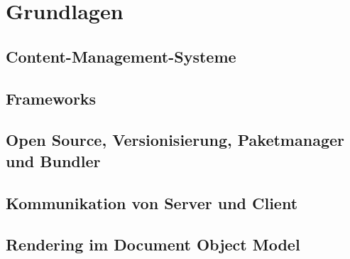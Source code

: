 \newpage
\section{Grundlagen}
\subsection{Content-Management-Systeme}
\subsection{Frameworks}
\subsection{Open Source, Versionisierung, Paketmanager und Bundler}
\subsection{Kommunikation von Server und Client}
\subsection{Rendering im Document Object Model}

